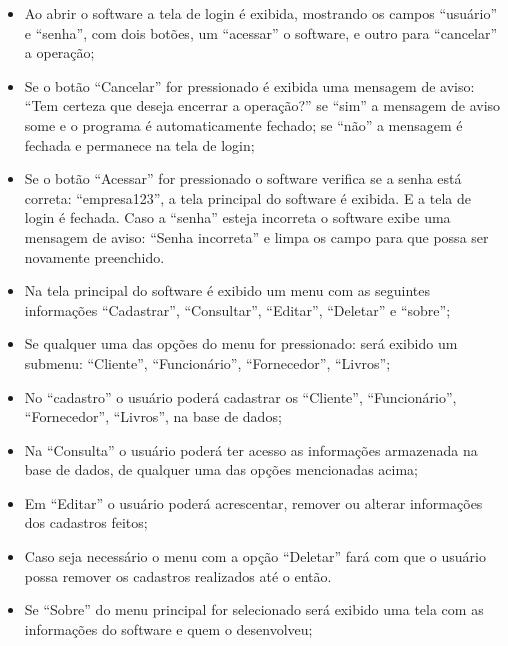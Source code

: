 \begin{itemize}

\item Ao abrir o software a tela de login é exibida, mostrando os campos “usuário” e “senha”, com dois botões, um “acessar” o software, e outro para “cancelar” a operação;

\item Se o botão “Cancelar” for pressionado é exibida uma mensagem de aviso: “Tem certeza que deseja encerrar a operação?” se “sim” a mensagem de aviso some e o programa é automaticamente fechado; se “não” a mensagem é fechada e permanece na tela de login;

\item Se o botão “Acessar” for pressionado o software verifica se a senha está correta: “empresa123”, a tela principal do software é exibida. E a tela de login é fechada. Caso a “senha” esteja incorreta o software exibe uma mensagem de aviso: “Senha incorreta” e limpa os campo para que possa ser novamente preenchido.

\item Na tela principal do software é exibido um menu com as seguintes informações “Cadastrar”, “Consultar”, “Editar”, “Deletar” e “sobre”;

\item Se qualquer uma das opções do menu for pressionado: será exibido um submenu: “Cliente”, “Funcionário”, “Fornecedor”, “Livros”;

\item No “cadastro” o usuário poderá cadastrar os “Cliente”, “Funcionário”, “Fornecedor”, “Livros”, na base de dados;

\item Na “Consulta” o usuário poderá ter acesso as informações armazenada na base de dados, de qualquer uma das opções mencionadas acima;

\item Em “Editar” o usuário poderá acrescentar, remover ou alterar informações dos cadastros feitos;

\item Caso seja necessário o menu com a opção “Deletar” fará com que o usuário possa remover os  cadastros realizados até o então.

\item Se  “Sobre” do menu principal for selecionado será exibido uma tela com as informações do software e quem o desenvolveu;


\end{itemize}


